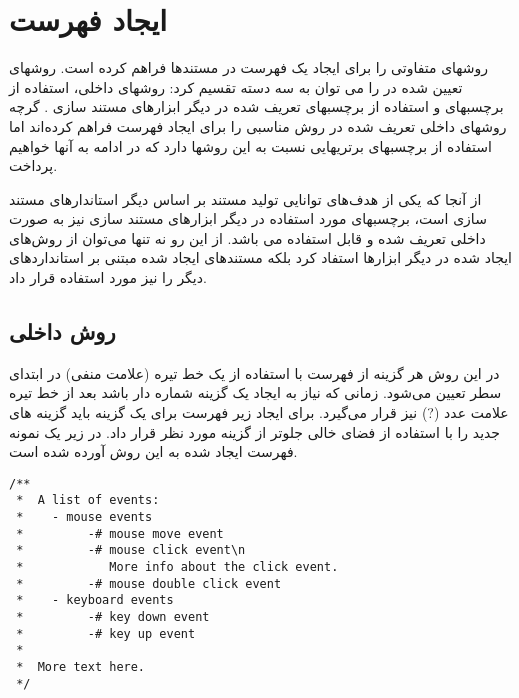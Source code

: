 %
% 
% 
% 
%
\chapter{ایجاد فهرست}

 روشهای متفاوتی را برای ایجاد یک فهرست در مستندها فراهم کرده است.
روشهای تعیین شده در  را می توان به سه دسته تقسیم کرد: روشهای داخلی،
استفاده از برچسبهای  و استفاده از برچسبهای تعریف شده در دیگر ابزارهای
مستند سازی . گرچه روشهای داخلی تعریف شده در  روش مناسبی را برای
ایجاد فهرست فراهم کرده‌اند اما استفاده از برچسبهای  برتریهایی نسبت به
این روشها دارد که در ادامه به آنها خواهیم پرداخت.

از آنجا که یکی از هدف‌های  توانایی تولید مستند بر اساس دیگر
استاندارهای مستند سازی است، برچسبهای مورد استفاده در دیگر ابزارهای مستند سازی
نیز به صورت داخلی تعریف شده و قابل استفاده می باشد. از این رو نه تنها می‌توان از
روش‌های ایجاد شده در دیگر ابزارها استفاد کرد بلکه مستند‌های ایجاد شده مبتنی بر
استانداردهای دیگر را نیز مورد استفاده قرار داد.

\section{روش داخلی}

در این روش هر گزینه از فهرست با استفاده از یک خط تیره (علامت منفی) در ابتدای سطر
تعیین می‌شود. زمانی که نیاز به ایجاد یک گزینه شماره دار باشد بعد از خط تیره
علامت عدد (?) نیز قرار می‌گیرد. برای ایجاد زیر فهرست برای یک گزینه باید گزینه
های جدید را با استفاده از فضای خالی جلوتر از گزینه مورد نظر قرار داد.
در زیر یک نمونه فهرست ایجاد شده به این روش آورده شده است.

\begin{latin}
\lstset{language=C++}  
\begin{lstlisting}[frame=single] 
/**
 *  A list of events:
 *    - mouse events
 *         -# mouse move event
 *         -# mouse click event\n
 *            More info about the click event.
 *         -# mouse double click event
 *    - keyboard events
 *         -# key down event
 *         -# key up event
 *
 *  More text here.
 */
\end{lstlisting}
\end{latin}


